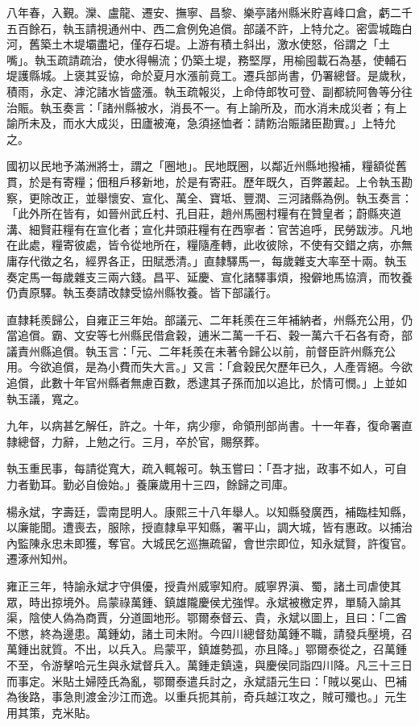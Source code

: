 \begin{pinyinscope}
八年春，入覲。灤、盧龍、遷安、撫寧、昌黎、樂亭諸州縣米貯喜峰口倉，虧二千五百餘石，執玉請視通州中、西二倉例免追償。部議不許，上特允之。密雲城臨白河，舊築土木堤壩盡圮，僅存石堤。上游有積土斜出，激水使怒，俗謂之「土嘴」。執玉疏請疏治，使水得暢流；仍築土堤，務堅厚，用榆囤載石為基，使輔石堤護縣城。上褒其妥協，命於夏月水漲前竟工。遷兵部尚書，仍署總督。是歲秋，積雨，永定、滹沱諸水皆盛漲。執玉疏報災，上命侍郎牧可登、副都統阿魯等分往治賑。執玉奏言：「諸州縣被水，消長不一。有上諭所及，而水消未成災者；有上諭所未及，而水大成災，田廬被淹，急須拯恤者：請飭治賑諸臣勘實。」上特允之。

國初以民地予滿洲將士，謂之「圈地」。民地既圈，以鄰近州縣地撥補，糧額從舊貫，於是有寄糧；佃租戶移新地，於是有寄莊。歷年既久，百弊叢起。上令執玉勘察，更除改正，並舉懷安、宣化、萬全、寶坻、豐潤、三河諸縣為例。執玉奏言：「此外所在皆有，如晉州武丘村、孔目莊，趙州馬圈村糧有在贊皇者；蔚縣夾道溝、細賢莊糧有在宣化者；宣化井頭莊糧有在西寧者：官苦追呼，民勞跋涉。凡地在此處，糧寄彼處，皆令從地所在，糧隨產轉，此收彼除，不使有交錯之病，亦無庸存代徵之名，經界各正，田賦悉清。」直隸驛馬一，每歲雜支大率至十兩。執玉奏定馬一每歲雜支三兩六錢。昌平、延慶、宣化諸驛事煩，撥僻地馬協濟，而牧養仍責原驛。執玉奏請改隸受協州縣牧養。皆下部議行。

直隸耗羨歸公，自雍正三年始。部議元、二年耗羨在三年補納者，州縣充公用，仍當追償。霸、文安等七州縣民借倉穀，逋米二萬一千石、穀一萬六千石各有奇，部議責州縣追償。執玉言：「元、二年耗羨在未著令歸公以前，前督臣許州縣充公用。今欲追償，是為小費而失大言。」又言：「倉穀民欠歷年已久，人產胥絕。今欲追償，此數十年官州縣者無慮百數，悉逮其子孫而加以追比，於情可憫。」上並如執玉議，寬之。

九年，以病甚乞解任，許之。十年，病少瘳，命領刑部尚書。十一年春，復命署直隸總督，力辭，上勉之行。三月，卒於官，賜祭葬。

執玉重民事，每請從寬大，疏入輒報可。執玉嘗曰：「吾才拙，政事不如人，可自力者勤耳。勤必自儉始。」養廉歲用十三四，餘歸之司庫。

楊永斌，字壽廷，雲南昆明人。康熙三十八年舉人。以知縣發廣西，補臨桂知縣，以廉能聞。遭喪去，服除，授直隸阜平知縣，署平山，調大城，皆有惠政。以捕治內監陳永忠未即獲，奪官。大城民乞巡撫疏留，會世宗即位，知永斌賢，許復官。遷涿州知州。

雍正三年，特諭永斌才守俱優，授貴州威寧知府。威寧界滇、蜀，諸土司虐使其眾，時出掠境外。烏蒙祿萬鍾、鎮雄隴慶侯尤強悍。永斌被檄定界，單騎入諭其渠，陰使人偽為商賈，分道圖地形。鄂爾泰督云、貴，永斌以圖上，且曰：「二酋不懲，終為邊患。萬鍾幼，諸土司未附。今四川總督劾萬鍾不職，請發兵壓境，召萬鍾出就質。不出，以兵入。烏蒙平，鎮雄勢孤，亦且降。」鄂爾泰從之，召萬鍾不至，令游擊哈元生與永斌督兵入。萬鍾走鎮遠，與慶侯同詣四川降。凡三十三日而事定。米貼土婦陸氏為亂，鄂爾泰遣兵討之，永斌語元生曰：「賊以冕山、巴補為後路，事急則渡金沙江而逸。以重兵扼其前，奇兵越江攻之，賊可殲也。」元生用其策，克米貼。


\end{pinyinscope}
